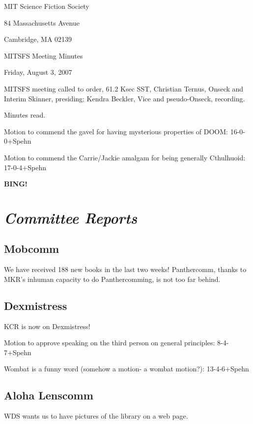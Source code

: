 \documentclass[10pt]{article}
\newcommand{\bing}{{\bf BING!} }
\newcommand{\goto}[1]{\bing \vskip 12pt \section*{{\em{#1}}}}
\begin{document}
\begin{center}

MIT Science Fiction Society

84 Massachusetts Avenue

Cambridge, MA 02139

\vspace{12pt}

MITSFS Meeting Minutes

Friday, August 3, 2007

\end{center}

\vspace{18pt}

\setlength{\parskip}{6pt}

\noindent
MITSFS meeting called to order, 61.2 Ksec SST,
Christian Ternus, Onseck and Interim Skinner, presiding; Kendra Beckler, Vice and pseudo-Onseck, recording.

Minutes read.

Motion to commend the gavel for having mysterious properties of DOOM: 16-0-0+Spehn

Motion to commend the Carrie/Jackie amalgam for being generally Cthulhuoid: 17-0-4+Spehn

\goto{Committee Reports}

\subsection*{Mobcomm}

We have received 188 new books in the last two weeks!  Panthercomm, thanks to MKR's inhuman capacity to do Panthercomming, is not too far behind.

\subsection*{Dexmistress}

KCR is now on Dexmistress!

Motion to approve speaking on the third person on general principles: 8-4-7+Spehn

Wombat is a funny word (somehow a motion- a wombat motion?): 13-4-6+Spehn

\subsection*{Aloha Lenscomm}

WDS wants us to have pictures of the library on a web page.
\end{document}
